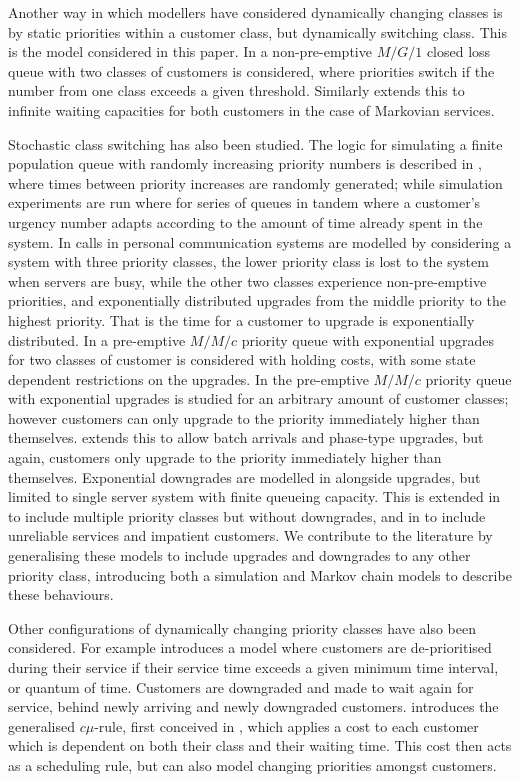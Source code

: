 \documentclass{article}
\begin{document}
Another way in which modellers have considered dynamically changing classes is
by static priorities within a customer class, but dynamically switching class.
This is the model considered in this paper.
In \cite{fratini90} a non-pre-emptive $M/G/1$ closed loss queue with two classes
of customers is considered, where priorities switch if the number from one class
exceeds a given threshold.
Similarly \cite{knessl03} extends this to infinite waiting capacities for both
customers in the case of Markovian services.

Stochastic class switching has also been studied.
The logic for simulating a finite population queue with randomly increasing
priority numbers is described in \cite{panayiotopoulos80}, where times between
priority increases are randomly generated; while \cite{grindlay65} simulation
experiments are run where for series of queues in tandem where a customer's
urgency number adapts according to the amount of time already spent in the
system.
In \cite{xhafa01} calls in personal communication systems are modelled by
considering a system with three priority classes, the lower priority class is
lost to the system when servers are busy, while the other two classes experience
non-pre-emptive priorities, and exponentially distributed upgrades from the
middle priority to the highest priority.
That is the time for a customer to upgrade is exponentially distributed.
In \cite{down10} a pre-emptive $M/M/c$ priority queue with exponential upgrades
for two classes of customer is considered with holding costs, with some state
dependent restrictions on the upgrades.
In \cite{xie08} the pre-emptive $M/M/c$ priority queue with exponential upgrades
is studied for an arbitrary amount of customer classes; however customers can
only upgrade to the priority immediately higher than themselves.
\cite{he12} extends this to allow batch arrivals and phase-type upgrades, but
again, customers only upgrade to the priority immediately higher than
themselves.
Exponential downgrades are modelled in \cite{klimenok20} alongside upgrades, but
limited to single server system with finite queueing capacity.
This is extended in \cite{leeetal20} to include multiple priority classes but
without downgrades, and in \cite{dudin21} to include unreliable services and
impatient customers.
We contribute to the literature by generalising these models to include upgrades
and downgrades to any other priority class, introducing both a simulation and
Markov chain models to describe these behaviours.

Other configurations of dynamically changing priority classes have also been
considered.
For example \cite{adiri71} introduces a model where customers are de-prioritised
during their service if their service time exceeds a given minimum time
interval, or quantum of time.
Customers are downgraded and made to wait again for service, behind newly
arriving and newly downgraded customers.
\cite{vanmieghan95} introduces the generalised $c\mu$-rule, first conceived in
\cite{smith56}, which applies a cost to each customer which is dependent on both
their class and  their waiting time.
This cost then acts as a scheduling rule, but can also model changing priorities
amongst customers.
\end{document}
